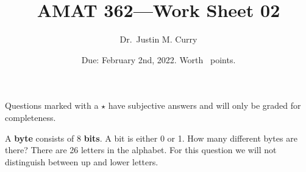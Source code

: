 \documentclass[addpoints,12pt]{exam}
\title{\vspace{-1in} AMAT 362---Work Sheet 02}
\date{Due: February 2nd, 2022. Worth \numpoints\ points.}
\author{Dr.~Justin M. Curry}
\begin{document}
\maketitle


Questions marked with a $\star$ have subjective answers and will only be graded for completeness.
\begin{questions}
\addpoints
	\question[1] A \textbf{byte} consists of 8 \textbf{bits}. A bit is either 0 or 1. How many different bytes are there?
	\vspace{.5in}
	\question[3] There are 26 letters in the alphabet. For this question we will not distinguish between up and lower letters.
	\noaddpoints
\end{questions}
\end{document}
